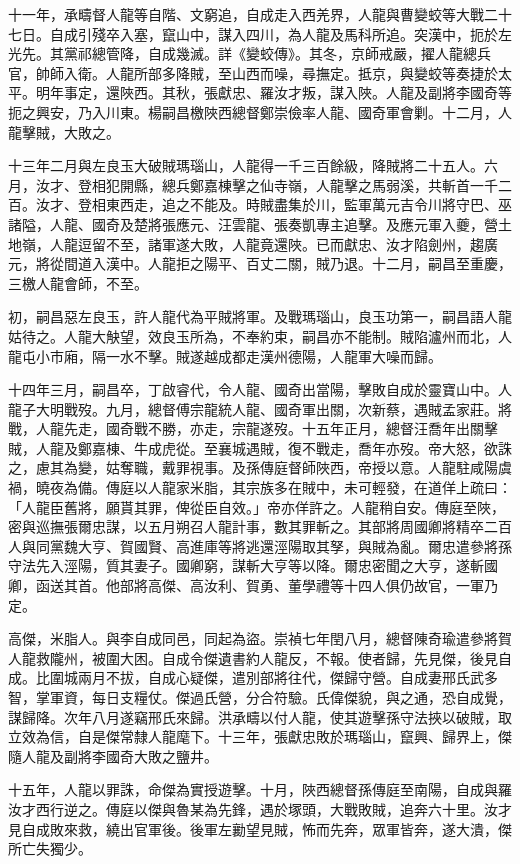 \begin{pinyinscope}
十一年，承疇督人龍等自階、文窮追，自成走入西羌界，人龍與曹變蛟等大戰二十七日。自成引殘卒入塞，竄山中，謀入四川，為人龍及馬科所追。突漢中，扼於左光先。其黨祁總管降，自成幾滅。詳《變蛟傳》。其冬，京師戒嚴，擢人龍總兵官，帥師入衛。人龍所部多降賊，至山西而噪，尋撫定。抵京，與變蛟等奏捷於太平。明年事定，還陜西。其秋，張獻忠、羅汝才叛，謀入陜。人龍及副將李國奇等扼之興安，乃入川東。楊嗣昌檄陜西總督鄭崇儉率人龍、國奇軍會剿。十二月，人龍擊賊，大敗之。

十三年二月與左良玉大破賊瑪瑙山，人龍得一千三百餘級，降賊將二十五人。六月，汝才、登相犯開縣，總兵鄭嘉棟擊之仙寺嶺，人龍擊之馬弱溪，共斬首一千二百。汝才、登相東西走，追之不能及。時賊盡集於川，監軍萬元吉令川將守巴、巫諸隘，人龍、國奇及楚將張應元、汪雲龍、張奏凱專主追擊。及應元軍入夔，營土地嶺，人龍逗留不至，諸軍遂大敗，人龍竟還陜。已而獻忠、汝才陷劍州，趨廣元，將從間道入漢中。人龍拒之陽平、百丈二關，賊乃退。十二月，嗣昌至重慶，三檄人龍會師，不至。

初，嗣昌惡左良玉，許人龍代為平賊將軍。及戰瑪瑙山，良玉功第一，嗣昌語人龍姑待之。人龍大觖望，效良玉所為，不奉約束，嗣昌亦不能制。賊陷瀘州而北，人龍屯小市廂，隔一水不擊。賊遂越成都走漢州德陽，人龍軍大噪而歸。

十四年三月，嗣昌卒，丁啟睿代，令人龍、國奇出當陽，擊敗自成於靈寶山中。人龍子大明戰歿。九月，總督傅宗龍統人龍、國奇軍出關，次新蔡，遇賊孟家莊。將戰，人龍先走，國奇戰不勝，亦走，宗龍遂歿。十五年正月，總督汪喬年出關擊賊，人龍及鄭嘉棟、牛成虎從。至襄城遇賊，復不戰走，喬年亦歿。帝大怒，欲誅之，慮其為變，姑奪職，戴罪視事。及孫傳庭督師陜西，帝授以意。人龍駐咸陽虞禍，曉夜為備。傳庭以人龍家米脂，其宗族多在賊中，未可輕發，在道佯上疏曰：「人龍臣舊將，願貰其罪，俾從臣自效。」帝亦佯許之。人龍稍自安。傳庭至陜，密與巡撫張爾忠謀，以五月朔召人龍計事，數其罪斬之。其部將周國卿將精卒二百人與同黨魏大亨、賀國賢、高進庫等將逃還涇陽取其孥，與賊為亂。爾忠遣參將孫守法先入涇陽，質其妻子。國卿窮，謀斬大亨等以降。爾忠密聞之大亨，遂斬國卿，函送其首。他部將高傑、高汝利、賀勇、董學禮等十四人俱仍故官，一軍乃定。

高傑，米脂人。與李自成同邑，同起為盜。崇禎七年閏八月，總督陳奇瑜遣參將賀人龍救隴州，被圍大困。自成令傑遺書約人龍反，不報。使者歸，先見傑，後見自成。比圍城兩月不拔，自成心疑傑，遣別部將往代，傑歸守營。自成妻邢氏武多智，掌軍資，每日支糧仗。傑過氏營，分合符驗。氏偉傑貌，與之通，恐自成覺，謀歸降。次年八月遂竊邢氏來歸。洪承疇以付人龍，使其遊擊孫守法挾以破賊，取立效為信，自是傑常隸人龍麾下。十三年，張獻忠敗於瑪瑙山，竄興、歸界上，傑隨人龍及副將李國奇大敗之鹽井。

十五年，人龍以罪誅，命傑為實授遊擊。十月，陜西總督孫傳庭至南陽，自成與羅汝才西行逆之。傳庭以傑與魯某為先鋒，遇於塚頭，大戰敗賊，追奔六十里。汝才見自成敗來救，繞出官軍後。後軍左勷望見賊，怖而先奔，眾軍皆奔，遂大潰，傑所亡失獨少。


\end{pinyinscope}
